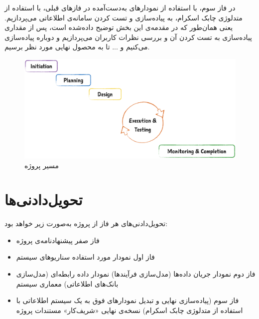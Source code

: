در فاز سوم، با استفاده از نمودار‌های به‌دست‌آمده در فاز‌های قبلی، با استفاده از متدلوژی چابک اسکرام، به پیاده‌سازی و تست کردن سامانه‌ی اطلاعاتی می‌پردازیم. یعنی همان‌طور که در مقدمه‌ی این بخش توضیح داده‌شده است، پس از مقداری پیاده‌سازی به تست کردن آن و بررسی نظرات کاربران می‌پردازیم و دوباره پیاده‌سازی می‌کنیم و ... تا به محصول نهایی مورد نظر برسیم. 

\begin{figure}[h]
	\centering\includegraphics[scale=0.25]{proj_phases}
	\caption{مسیر پروژه}
	\label{phases} %
\end{figure}

\pagebreak
\section{تحویل‌دادنی‌ها}
تحویل‌دادنی‌های هر فاز از پروژه به‌صورت زیر خواهد بود:

\begin{itemize}
	\item 
	فاز صفر
	\subitem
	پیشنهادنامه‌ی پروژه
	\item 
	فاز اول
	\subitem نمودار مورد استفاده 
	\subitem سناریوهای سیستم
	
	\item 
	فاز دوم
	\subitem نمودار جریان داده‌ها 
	(مدل‌سازی فرآیندها)
	\subitem
	نمودار داده رابطه‌ای
	(مدل‌سازی بانک‌های اطلاعاتی)
	\subitem معماری سیستم
	
	\item فاز سوم (پیاده‌سازی نهایی و تبدیل نمودارهای فوق به یک سیستم اطلاعاتی با استفاده از متدلوژی چابک اسکرام)
	\subitem نسخه‌ی نهایی «شریف‌کار»
	\subitem مستندات پروژه
	
\end{itemize}